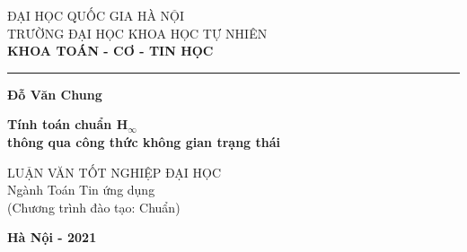 \begin{titlepage}


\begin{center}
	{\fontsize{14pt}{15.6}\selectfont
		ĐẠI HỌC QUỐC GIA HÀ NỘI \\
		TRƯỜNG ĐẠI HỌC KHOA HỌC TỰ NHIÊN\\}
	\medspace
	{\fontsize{13pt}{15.6}\selectfont
		\textbf{KHOA TOÁN - CƠ - TIN HỌC}}
	
	\rule{7.25cm}{1pt}
	
	\vfill
	{\fontsize{14}{15.6}\selectfont \textbf{Đỗ Văn Chung}}
	\vfill
	
	{\fontsize{18}{20}\selectfont \textbf{Tính toán chuẩn H$_\infty$ \\ thông qua công thức không gian trạng thái}}
	\vfill
	
	{\fontsize{14}{15.6}\selectfont 
		LUẬN VĂN TỐT NGHIỆP ĐẠI HỌC\\
		\vspace{1cm}
		Ngành Toán Tin ứng dụng\\
		(Chương trình đào tạo: Chuẩn)
	}
	
	\vfill
	{\fontsize{14}{15.6}\selectfont \textbf{Hà Nội - 2021}}
\end{center}
\end{titlepage}

